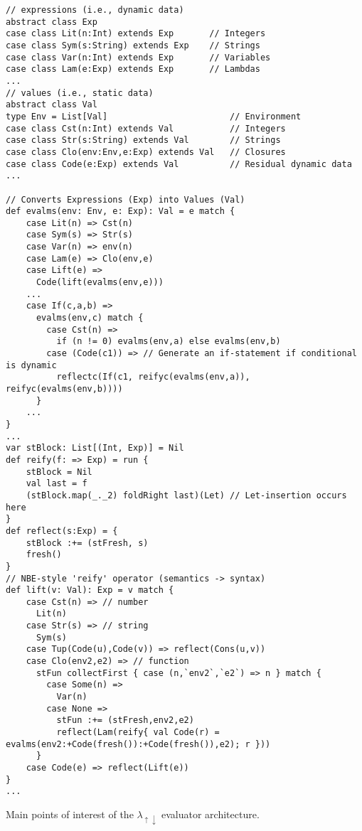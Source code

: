 \documentclass[a4paper,12pt,twoside,openright]{report}
\theoremstyle{definition}
\newcommand{\mslang}{$\lambda_{\uparrow\downarrow}$}
\newenvironment{longlisting}{\captionsetup{type=listing}}{}
\begin{document}

\begin{longlisting}
    \centering
    \begin{verbatim}
// expressions (i.e., dynamic data)
abstract class Exp
case class Lit(n:Int) extends Exp       // Integers
case class Sym(s:String) extends Exp    // Strings
case class Var(n:Int) extends Exp       // Variables
case class Lam(e:Exp) extends Exp       // Lambdas
...
// values (i.e., static data)
abstract class Val
type Env = List[Val]                        // Environment
case class Cst(n:Int) extends Val           // Integers
case class Str(s:String) extends Val        // Strings
case class Clo(env:Env,e:Exp) extends Val   // Closures
case class Code(e:Exp) extends Val          // Residual dynamic data
...

// Converts Expressions (Exp) into Values (Val)
def evalms(env: Env, e: Exp): Val = e match {
    case Lit(n) => Cst(n)
    case Sym(s) => Str(s)
    case Var(n) => env(n)
    case Lam(e) => Clo(env,e)
    case Lift(e) =>
      Code(lift(evalms(env,e)))
    ...
    case If(c,a,b) =>
      evalms(env,c) match {
        case Cst(n) => 
          if (n != 0) evalms(env,a) else evalms(env,b)
        case (Code(c1)) => // Generate an if-statement if conditional is dynamic
          reflectc(If(c1, reifyc(evalms(env,a)), reifyc(evalms(env,b))))
      }
    ...
}
...
var stBlock: List[(Int, Exp)] = Nil
def reify(f: => Exp) = run {
    stBlock = Nil
    val last = f
    (stBlock.map(_._2) foldRight last)(Let) // Let-insertion occurs here
}
def reflect(s:Exp) = {
    stBlock :+= (stFresh, s)
    fresh()
}
// NBE-style 'reify' operator (semantics -> syntax)
def lift(v: Val): Exp = v match {
    case Cst(n) => // number
      Lit(n)
    case Str(s) => // string
      Sym(s)
    case Tup(Code(u),Code(v)) => reflect(Cons(u,v))
    case Clo(env2,e2) => // function
      stFun collectFirst { case (n,`env2`,`e2`) => n } match {
        case Some(n) =>
          Var(n)
        case None =>
          stFun :+= (stFresh,env2,e2)
          reflect(Lam(reify{ val Code(r) = evalms(env2:+Code(fresh()):+Code(fresh()),e2); r }))
      }
    case Code(e) => reflect(Lift(e))
}
...
    \end{verbatim}
    \caption{Main points of interest of the \mslang{} evaluator architecture.}
    \label{lst:evalms}
\end{longlisting}
\end{document}
